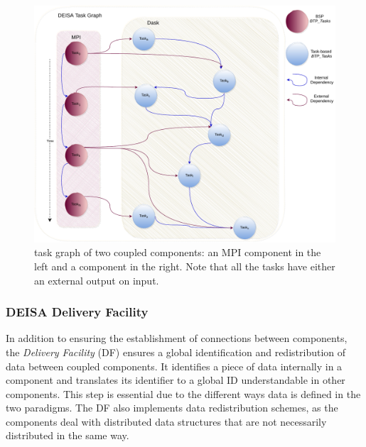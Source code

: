 \begin{figure}[h!]\centering
\includegraphics[width=0.75\columnwidth]{figures/WUG.pdf}
\caption{\deisa task graph of two coupled components: an MPI component in the left and a \dask component in the right. Note that all the tasks have either an external output on input.}
\label{figWUG}
\end{figure}

\subsubsection{DEISA Delivery Facility}\label{DF}
In addition to ensuring the establishment of connections between components, the \textit{Delivery Facility} (DF) ensures a global identification and redistribution of data between coupled components. 
It identifies a piece of data internally in a component and translates its identifier to a global ID understandable in other components. This step is essential due to the different ways data is defined in the two paradigms. The DF also implements data redistribution schemes, as the components deal with distributed data structures that are not necessarily distributed in the same way.   



